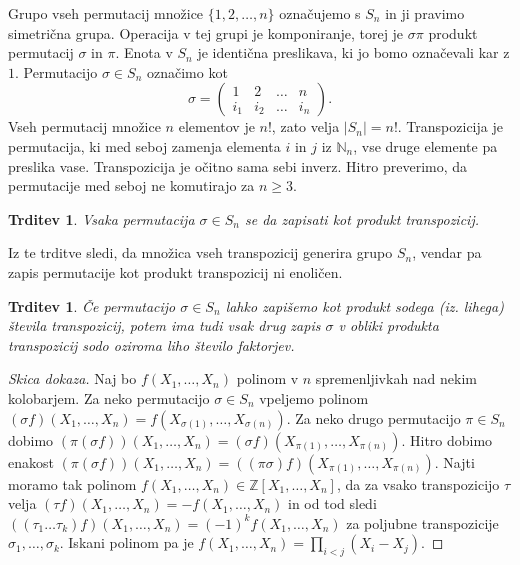 \documentclass[10pt, a4paper]{article}
\newtheorem{trditev}[izr]{Trditev}
\newenvironment{noticeC}{%
  \tcolorbox[%
  notitle,
  empty,
  enhanced,  %
  breakable,
  coltext=black, 
  fontupper=\rmfamily,
  parbox=false,
  noparskip,
  sharp corners,
  boxrule=-1pt,  %
  frame hidden,
  left=7pt,  %
  right=7pt,
  top=5pt,
  bottom=5pt,
  before skip=2.5ex plus 2pt,
  after skip=2.5ex plus 2pt,
  overlay unbroken and last={%
  },
  ]}
{\endtcolorbox}
\newenvironment{dokaz}%
  {\begin{noticeC}\begin{proof}}%
  {\end{proof}\end{noticeC}}
\newcommand{\N}{\mathbb {N}}
\newcommand{\Z}{\mathbb {Z}}
\begin{document}
Grupo vseh permutacij množice $\{1, 2, \dots, n\}$ označujemo s $S_n$ in ji pravimo simetrična grupa.
Operacija v tej grupi je komponiranje, torej je $\sigma \pi$ produkt permutacij $\sigma$ in $\pi$.
Enota v $S_n$ je identična preslikava, ki jo bomo označevali kar z $1$.
Permutacijo $\sigma \in S_n$ označimo kot 
$$\sigma = \begin{pmatrix}
  1 & 2 & \dots & n\\
  i_1 & i_2 & \dots & i_n
\end{pmatrix}.$$
Vseh permutacij množice $n$ elementov je $n!$, zato velja $|S_n| = n!$.
Transpozicija je permutacija, ki med seboj zamenja elementa $i$ in $j$ iz $\N_n$,
vse druge elemente pa preslika vase. Transpozicija je očitno sama sebi inverz.
Hitro preverimo, da permutacije med seboj ne komutirajo za $n \geq 3$.

\begin{trditev}
  Vsaka permutacija $\sigma \in S_n$ se da zapisati kot produkt transpozicij.
\end{trditev}

Iz te trditve sledi, da množica vseh transpozicij generira grupo $S_n$,
vendar pa zapis permutacije kot produkt transpozicij ni enoličen.

\begin{trditev}
  Če permutacijo $\sigma \in S_n$ lahko zapišemo kot produkt sodega (iz. lihega)
  števila transpozicij, potem ima tudi vsak drug zapis $\sigma$ v obliki produkta transpozicij 
  sodo oziroma liho število faktorjev.
\end{trditev}

\begin{dokaz}[Skica dokaza]
  Naj bo $f(X_1, \dots, X_n)$ polinom v $n$ spremenljivkah nad nekim kolobarjem. Za neko permutacijo $\sigma \in S_n$
  vpeljemo polinom $(\sigma f) (X_1, \dots, X_n) = f(X_{\sigma(1)}, \dots, X_{\sigma(n)})$.
  Za neko drugo permutacijo $\pi \in S_n$ dobimo $(\pi(\sigma f)) (X_1, \dots, X_n) = (\sigma f)(X_{\pi(1)}, \dots, X_{\pi(n)})$.
  Hitro dobimo enakost $(\pi(\sigma f)) (X_1, \dots, X_n) = ((\pi \sigma) f)(X_{\pi(1)}, \dots, X_{\pi(n)})$.
  Najti moramo tak polinom $f(X_1, \dots, X_n) \in \Z[X_1, \dots, X_n]$, da za vsako transpozicijo $\tau$
  velja $(\tau f)(X_1, \dots, X_n) = -f(X_1, \dots, X_n)$ in od tod sledi 
  $((\tau_1 \dots \tau_k) f)(X_1, \dots, X_n) = (-1)^k f(X_1, \dots, X_n)$ za poljubne transpozicije $\sigma_1, \dots, \sigma_k$.
  Iskani polinom pa je $f(X_1, \dots, X_n) = \prod_{i < j} (X_i - X_j)$.
\end{dokaz}
\end{document}
